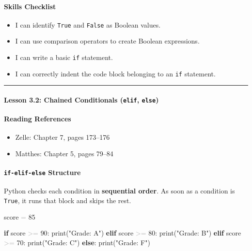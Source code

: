 \documentclass[
  justified,
  openright,
]{tufte-book}
\let\subsection\paragraph
\let\paragraph\paragraph
\newcommand{\KeywordTok}[1]{\textcolor{CodeKeyword}{\textbf{#1}}}  %
\newcommand{\StringTok}[1]{\textcolor{CodeString}{#1}}              %
\newcommand{\CodeNumTok}[1]{\textcolor{CodeNumber}{#1}}             %
\newcommand{\OperatorTok}[1]{\textcolor{DarkGray}{#1}}              %
\newenvironment{Shaded}{%
  \begin{mdframed}[style=TufteCode]%
}{%
  \end{mdframed}%
}
\let\subsection\paragraph
\let\paragraph\paragraph
\providecommand{\tightlist}{%
  \setlength{\itemsep}{0pt}\setlength{\parskip}{0pt}}
\begin{document}
\subsection{Skills Checklist}\label{skills-checklist-12}

\begin{itemize}
\tightlist
\item[$\square$]
  I can identify \texttt{True} and \texttt{False} as Boolean values.
\item[$\square$]
  I can use comparison operators to create Boolean expressions.
\item[$\square$]
  I can write a basic \texttt{if} statement.
\item[$\square$]
  I can correctly indent the code block belonging to an \texttt{if}
  statement.
\end{itemize}

\begin{center}\rule{0.5\linewidth}{0.5pt}\end{center}

\subsection{\texorpdfstring{Lesson 3.2: Chained Conditionals
(\texttt{elif},
\texttt{else})}{Lesson 3.2: Chained Conditionals (elif, else)}}\label{lesson-3.2-chained-conditionals-elif-else}

\subsection{Reading References}\label{reading-references-13}

\begin{itemize}
\tightlist
\item
  Zelle: Chapter 7, pages 173--176
\item
  Matthes: Chapter 5, pages 79--84
\end{itemize}

\subsection{\texorpdfstring{\texttt{if-elif-else}
Structure}{if-elif-else Structure}}\label{if-elif-else-structure}

Python checks each condition in \textbf{sequential order}. As soon as a
condition is \texttt{True}, it runs that block and skips the rest.

\begin{Shaded}
\begin{Highlighting}[]
score \OperatorTok{=} \CodeNumTok{85}
 
\KeywordTok{if} score \OperatorTok{\textgreater{}=} \CodeNumTok{90}:
    print(\StringTok{"Grade: A"})
\KeywordTok{elif} score \OperatorTok{\textgreater{}=} \CodeNumTok{80}:
    print(\StringTok{"Grade: B"})
\KeywordTok{elif} score \OperatorTok{\textgreater{}=} \CodeNumTok{70}:
    print(\StringTok{"Grade: C"})
\KeywordTok{else}:
    print(\StringTok{"Grade: F"})
\end{Highlighting}
\end{Shaded}
\end{document}
